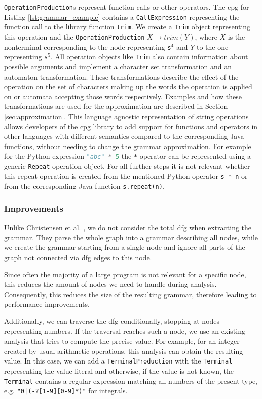 \lstinline|OperationProduction|s represent function calls or other operators. The \ac{cpg} for Listing \ref{lst:grammar_example} contains a \lstinline|CallExpression| representing the function call to the library function \lstinline|trim|. We create a \lstinline|Trim| object representing this operation and the \lstinline|OperationProduction| $X \rightarrow trim(Y)$, where $X$ is the nonterminal corresponding to the node representing \lstinline|s|$^4$ and $Y$ to the one representing \lstinline|s|$^5$. 
All operation objects like \lstinline|Trim| also contain information about possible arguments and implement a character set transformation and an automaton transformation. These transformations describe the effect of the operation on the set of characters making up the words the operation is applied on or automata accepting those words respectively.
Examples and how these transformations are used for the approximation are described in Section \ref{sec:approximation}.
This language agnostic representation of string operations allows developers of the \ac{cpg} library to add support for functions and operators in other languages with different semantics compared to the corresponding Java functions, without needing to change the grammar approximation. For example for the Python expression \lstinline[language=Python]|"abc" * 5| the \lstinline|*| operator can be represented using a generic \lstinline|Repeat| operation object. For all further steps it is not relevant whether this repeat operation is created from the mentioned Python operator \lstinline[language=Python]|s * n| or from the corresponding Java function \lstinline|s.repeat(n)|. 


\subsubsection{Improvements}

Unlike Christensen et al. \cite{brics}, we do not consider the total \ac{dfg} when extracting the grammar. They parse the whole graph into a grammar describing all nodes, while we create the grammar starting from a single node and ignore all parts of the graph not connected via \ac{dfg} edges to this node.

Since often the majority of a large program is not relevant for a specific node, this reduces the amount of nodes we need to handle during analysis. Consequently, this reduces the size of the resulting grammar, therefore leading to performance improvements.

Additionally, we can traverse the \ac{dfg} conditionally, stopping at nodes representing numbers. If the traversal reaches such a node, we use an existing analysis that tries to compute the precise value.
For example, for an integer created by usual arithmetic operations, this analysis can obtain the resulting value.
In this case, we can add a \lstinline|TerminalProduction| with the \lstinline|Terminal| representing the value literal and otherwise, if the value is not known, the \lstinline|Terminal| contains a regular expression matching all numbers of the present type, e.g. \lstinline{"0|(-?[1-9][0-9]*)"} for integrals.
	

